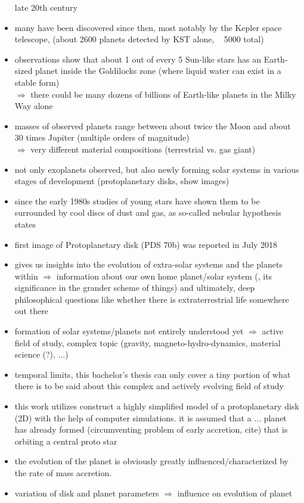 \begin{itemize}
      late 20th century
    \item many have been discovered since then, most notably by the Kepler 
      space telescope, (about 2600 planets detected by KST alone, ~ 5000 total)
    \item observations show that about 1 out of every 5 Sun-like stars has an 
      Earth-sized planet inside the Goldilocks zone 
      (where liquid water can exist in a stable form) \\
      $\Rightarrow$ there could be many dozens of billions of Earth-like planets 
      in the Milky Way alone
    \item masses of observed planets range between about twice the Moon and 
      about 30 times Jupiter (multiple orders of magnitude) \\
      $\Rightarrow$ very different material compositions
      (terrestrial vs. gas giant)
    \item not only exoplanets observed, but also newly forming solar systems in 
      various stages of development (protoplanetary disks, show images)
    \item since the early 1980s studies of young stars have shown them to be 
      surrounded by cool discs of dust and gas, as so-called 
      nebular hypothesis states
    \item first image of Protoplanetary disk (PDS 70b) was reported in July 2018
    \item gives us insights into the evolution of extra-solar systems and the
      planets within $\Rightarrow$ information about our own home 
      planet/solar system (, its significance in the grander scheme of things)
      and ultimately, deep philosophical questions like whether there is 
      extraterrestrial life somewhere out there
    \item formation of solar systems/planets not entirely understood yet
      $\Rightarrow$ active field of study, complex topic 
      (gravity, magneto-hydro-dynamics, material science (?), ...)
    \item temporal limits, this bachelor's thesis can only cover a tiny portion 
      of what there is to be said about this complex and actively evolving field 
      of study
    \item this work utilizes construct a highly simplified model of a 
      protoplanetary disk (2D) with the help of computer simulations. 
      it is assumed that a ... planet has already formed 
      (circumventing problem of early accretion, cite) that is orbiting a central 
      proto star
    \item the evolution of the planet is obviously greatly 
      influenced/characterized by the rate of mass accretion. 
    \item variation of disk and planet parameters $\Rightarrow$
      influence on evolution of planet
  \end{itemize}
  
